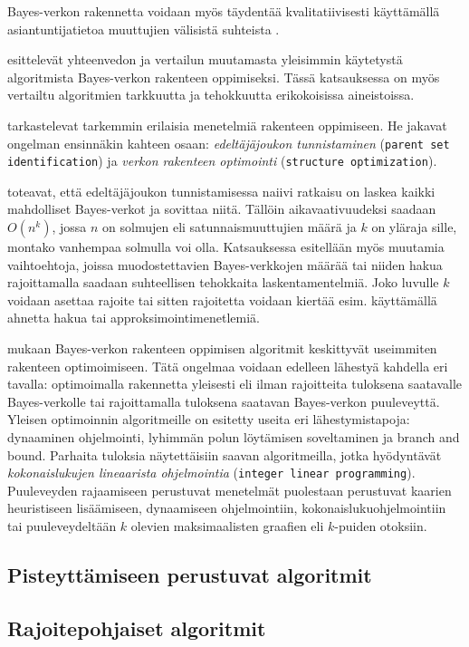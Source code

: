 Bayes-verkon rakennetta voidaan myös täydentää kvalitatiivisesti käyttämällä asiantuntijatietoa muuttujien välisistä suhteista \citep{ruggeri_bayesian_2008, myllymaki_bayes-verkkojen_1998}. 

\citet{mittal_review_2011} esittelevät yhteenvedon ja vertailun muutamasta yleisimmin käytetystä algoritmista Bayes-verkon rakenteen oppimiseksi. Tässä katsauksessa on myös vertailtu algoritmien tarkkuutta ja tehokkuutta erikokoisissa aineistoissa.

\citet{scanagatta_survey_2019} tarkastelevat tarkemmin erilaisia menetelmiä rakenteen oppimiseen. He jakavat ongelman ensinnäkin kahteen osaan: \emph{edeltäjäjoukon tunnistaminen} (\texttt{parent set identification}) ja \emph{verkon rakenteen optimointi} (\texttt{structure optimization}). 

\citet{scanagatta_survey_2019} toteavat, että edeltäjäjoukon tunnistamisessa naiivi ratkaisu on laskea kaikki mahdolliset Bayes-verkot ja sovittaa niitä. Tällöin aikavaativuudeksi saadaan $O(n^k)$, jossa $n$ on solmujen eli satunnaismuuttujien määrä ja $k$ on yläraja sille, montako vanhempaa solmulla voi olla. Katsauksessa esitellään myös muutamia vaihtoehtoja, joissa muodostettavien Bayes-verkkojen määrää tai niiden hakua rajoittamalla saadaan suhteellisen tehokkaita laskentamentelmiä. Joko luvulle $k$ voidaan asettaa rajoite tai sitten rajoitetta voidaan kiertää esim. käyttämällä ahnetta hakua tai approksimointimenetlemiä.

\citet{scanagatta_survey_2019} mukaan Bayes-verkon rakenteen oppimisen algoritmit keskittyvät useimmiten rakenteen optimoimiseen. Tätä ongelmaa voidaan edelleen lähestyä kahdella eri tavalla: optimoimalla rakennetta yleisesti eli ilman rajoitteita tuloksena saatavalle Bayes-verkolle tai rajoittamalla tuloksena saatavan Bayes-verkon puuleveyttä. Yleisen optimoinnin algoritmeille on esitetty useita eri lähestymistapoja: dynaaminen ohjelmointi, lyhimmän polun löytämisen soveltaminen ja branch and bound. Parhaita tuloksia näytettäisiin saavan algoritmeilla, jotka hyödyntävät \emph{kokonaislukujen lineaarista ohjelmointia} (\texttt{integer linear programming}). Puuleveyden rajaamiseen perustuvat menetelmät puolestaan perustuvat kaarien heuristiseen lisäämiseen, dynaamiseen ohjelmointiin, kokonaislukuohjelmointiin tai puuleveydeltään $k$ olevien maksimaalisten graafien eli $k$-puiden otoksiin.

\subsection{Pisteyttämiseen perustuvat algoritmit}
\subsection{Rajoitepohjaiset algoritmit}